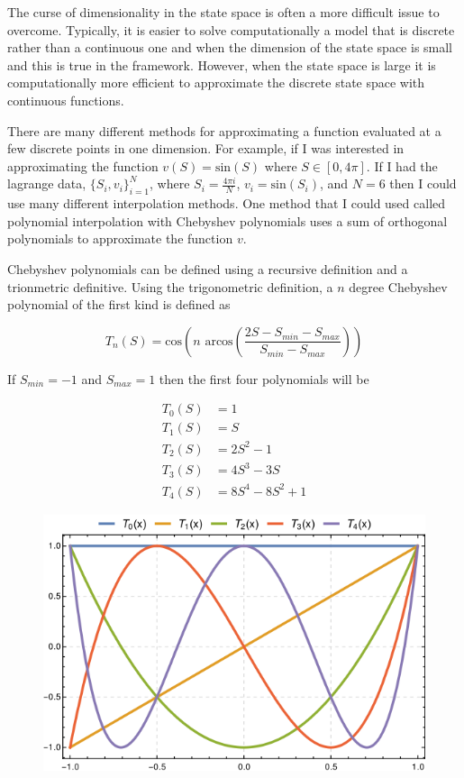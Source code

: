 \documentclass[12pt]{article}
\begin{document}
The curse of dimensionality in the state space is often a more difficult issue to overcome. Typically, it is easier to solve computationally a model that is discrete rather than a continuous one and when the dimension of the state space is small and this is true in the \citet{1995_Erickson_Pakes_RES} framework. However, when the state space is large it is computationally more efficient to approximate the discrete state space with continuous functions.

There are many different methods for approximating a function evaluated at a few discrete points in one dimension. For example, if I was interested in approximating the function $v(S)=\text{sin}(S)$ where $S \in [0, 4\pi]$. If I had the lagrange data, $\{S_i,v_i\}_{i=1}^N$, where $S_i=\frac{4\pi i}{N}$, $v_i=\text{sin}(S_i)$, and $N=6$ then I could use many different interpolation methods. One method that I could used called polynomial interpolation with Chebyshev polynomials uses a sum of orthogonal polynomials to approximate the function $v$.

Chebyshev polynomials can be defined using a recursive definition and a trionmetric definitive. Using the trigonometric definition, a $n$ degree Chebyshev polynomial of the first kind is defined as

\begin{equation*}
  T_n(S)=\text{cos}(n \text{ arcos}(\frac{2S-S_{min}-S_{max}}{S_{min}-S_{max}}))
\end{equation*}

If $S_{min}=-1$ and $S_{max}=1$ then the first four polynomials will be

\begin{equation*}
  \begin{aligned}
    T_0(S)&=1\\
    T_1(S)&=S\\
    T_2(S)&=2S^2-1\\
    T_3(S)&=4S^3-3S\\
    T_4(S)&=8S^4-8S^2+1
  \end{aligned}
\end{equation*}


\begin{figure}[H]
  \centering
  \includegraphics[scale=3]{plot_Chebyshev_Polynomials_of_the_First_Kind}
\end{figure}
\end{document}
